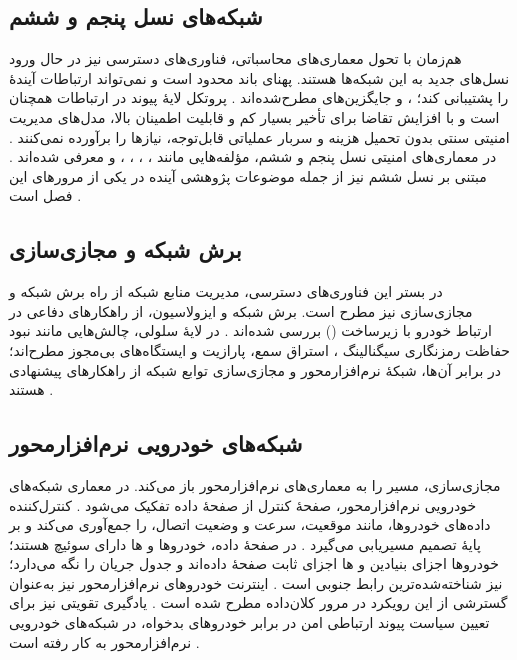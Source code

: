 \subsection{شبکه‌های نسل پنجم و ششم}
هم‌زمان با تحول معماری‌های محاسباتی، فناوری‌های دسترسی نیز در حال ورود نسل‌های جدید به این شبکه‌ها هستند. پهنای باند  محدود است و نمی‌تواند ارتباطات آیندهٔ  را پشتیبانی کند؛ ،  و  جایگزین‌های مطرح‌شده‌اند \cite{farsimadanReviewSecurityChallenges2025}. پروتکل لایهٔ پیوند در ارتباطات  همچنان  است و با افزایش تقاضا برای تأخیر بسیار کم و قابلیت اطمینان بالا، مدل‌های مدیریت امنیتی سنتی بدون تحمیل هزینه و سربار عملیاتی قابل‌توجه، نیازها را برآورده نمی‌کنند \cite{farsimadanReviewSecurityChallenges2025}. در معماری‌های امنیتی نسل پنجم و ششم، مؤلفه‌هایی مانند ، ، ، ،  و  معرفی شده‌اند \cite{farsimadanReviewSecurityChallenges2025}.  مبتنی بر نسل ششم نیز از جمله موضوعات پژوهشی آینده در یکی از مرورهای این فصل است \cite{hozouriOverviewVANETVehicular2023}.

\subsection{برش شبکه و مجازی‌سازی}
در بستر این فناوری‌های دسترسی، مدیریت منابع شبکه از راه برش شبکه و مجازی‌سازی نیز مطرح است. برش شبکه و ایزولاسیون، از راهکارهای دفاعی در ارتباط خودرو با زیرساخت () بررسی شده‌اند \cite{farsimadanReviewSecurityChallenges2025}. در لایهٔ سلولی، چالش‌هایی مانند نبود حفاظت رمزنگاری سیگنالینگ ، استراق سمع، پارازیت و ایستگاه‌های بی‌مجوز مطرح‌اند؛ در برابر آن‌ها، شبکهٔ نرم‌افزارمحور و مجازی‌سازی توابع شبکه از راهکارهای پیشنهادی هستند \cite{farsimadanReviewSecurityChallenges2025}.

\subsection{شبکه‌های خودرویی نرم‌افزارمحور}
مجازی‌سازی، مسیر را به معماری‌های نرم‌افزارمحور باز می‌کند. در معماری شبکه‌های خودرویی نرم‌افزارمحور، صفحهٔ کنترل از صفحهٔ داده تفکیک می‌شود \cite{hozouriOverviewVANETVehicular2023}. کنترل‌کننده داده‌های خودروها، مانند موقعیت، سرعت و وضعیت اتصال، را جمع‌آوری می‌کند و بر پایهٔ  تصمیم مسیریابی می‌گیرد \cite{hozouriOverviewVANETVehicular2023}. در صفحهٔ داده، خودروها و ها دارای سوئیچ  هستند؛ خودروها اجزای بنیادین و ها اجزای ثابت صفحهٔ داده‌اند و  جدول جریان  را نگه می‌دارد؛  نیز شناخته‌شده‌ترین رابط جنوبی است \cite{hozouriOverviewVANETVehicular2023}. اینترنت خودروهای نرم‌افزارمحور نیز به‌عنوان گسترشی از این رویکرد در مرور کلان‌داده مطرح شده است \cite{xuInternetVehiclesBig2018}. یادگیری تقویتی نیز برای تعیین سیاست پیوند ارتباطی امن در برابر خودروهای بدخواه، در شبکه‌های خودرویی نرم‌افزارمحور به کار رفته است \cite{farsimadanReviewSecurityChallenges2025}.

